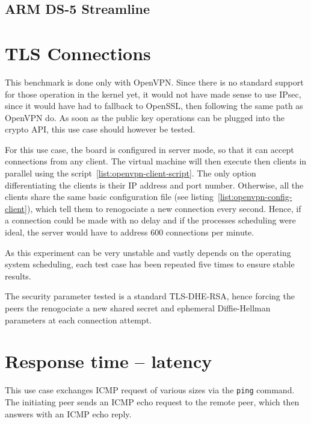 \subsection{ARM DS-5 Streamline}

\section{TLS Connections}
This benchmark is done only with OpenVPN.
Since there is no standard support for those operation in the kernel yet, it would not have made sense to use IPsec, since it would have had to fallback to OpenSSL, then following the same path as OpenVPN do.
As soon as the public key operations can be plugged into the crypto API, this use case should however be tested.

For this use case, the board is configured in server mode, so that it can accept connections from any client.
The virtual machine will then execute then clients in parallel using the script~\ref{list:openvpn-client-script}.
The only option differentiating the clients is their IP address and port number.
Otherwise, all the clients share the same basic configuration file (see listing~\ref{list:openvpn-config-client}), which tell them to renogociate a new connection every second.
Hence, if a connection could be made with no delay and if the processes scheduling were ideal, the server would have to address 600 connections per minute.

As this experiment can be very unstable and vastly depends on the operating system scheduling, each test case has been repeated five times to ensure stable results.



The security parameter tested is a standard TLS-DHE-RSA, hence forcing the peers the renogociate a new shared secret and ephemeral Diffie-Hellman parameters at each connection attempt.


\section{Response time -- latency}
This use case exchanges ICMP request of various sizes via the \texttt{ping} command.
The initiating peer sends an ICMP echo request to the remote peer, which then answers with an ICMP echo reply.

